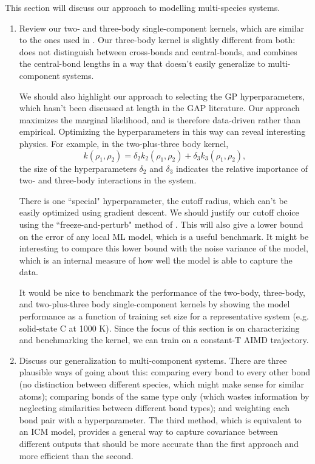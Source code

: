 \documentclass[%
reprint,
amsmath,amssymb,
aps,
]{revtex4-1}
\begin{document}
This section will discuss our approach to modelling multi-species systems.
\begin{enumerate}
\item Review our two- and three-body single-component kernels, which are similar to the ones used in \cite{glielmo2018efficient, deringer2017machine}. Our three-body kernel is slightly different from both: \cite{glielmo2018efficient} does not distinguish between cross-bonds and central-bonds, and \cite{deringer2017machine} combines the central-bond lengths in a way that doesn't easily generalize to multi-component systems.

We should also highlight our approach to selecting the GP hyperparameters, which hasn't been discussed at length in the GAP literature. Our approach maximizes the marginal likelihood, and is therefore data-driven rather than empirical. Optimizing the hyperparameters in this way can reveal interesting physics. For example, in the two-plus-three body kernel,
\begin{equation}
    k(\rho_1, \rho_2) = \delta_2 k_2 (\rho_1, \rho_2) + \delta_3 k_3(\rho_1, \rho_2),
\end{equation}
the size of the hyperparameters $\delta_2$ and $\delta_3$ indicates the relative importance of two- and three-body interactions in the system.

There is one ``special" hyperparameter, the cutoff radius, which can't be easily optimized using gradient descent. We should justify our cutoff choice using the ``freeze-and-perturb" method of \cite{deringer2017machine}. This will also give a lower bound on the error of any local ML model, which is a useful benchmark. It might be interesting to compare this lower bound with the noise variance of the model, which is an internal measure of how well the model is able to capture the data.

It would be nice to benchmark the performance of the two-body, three-body, and two-plus-three body single-component kernels by showing the model performance as a function of training set size for a representative system (e.g. solid-state C at 1000 K). Since the focus of this section is on characterizing and benchmarking the kernel, we can train on a constant-T AIMD trajectory.

\item Discuss our generalization to multi-component systems. There are three plausible ways of going about this: comparing every bond to every other bond (no distinction between different species, which might make sense for similar atoms); comparing bonds of the same type only (which wastes information by neglecting similarities between different bond types); and weighting each bond pair with a hyperparameter. The third method, which is equivalent to an ICM model, provides a general way to capture covariance between different outputs that should be more accurate than the first approach and more efficient than the second. 


\end{enumerate}
\end{document}
